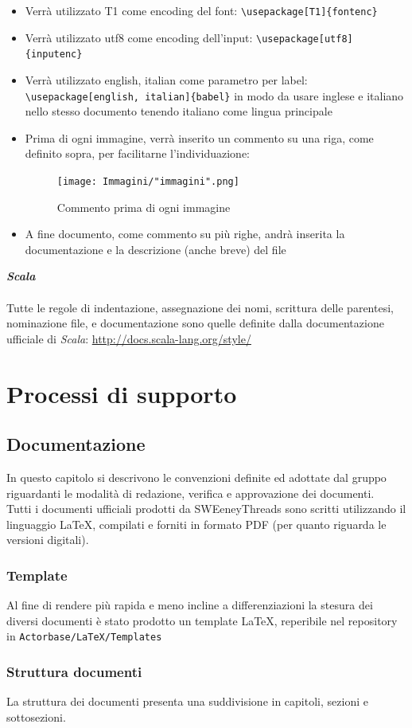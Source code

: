 \documentclass[a4paper]{report}
\newcommand{\mychapter}[2]{
	\setcounter{chapter}{#1}
	\setcounter{section}{0}
	\setcounter{subsection}{1}
	\chapter*{#2}
	\addcontentsline{toc}{chapter}{#2}
}
\begin{document}
\begin{itemize}
\begin{figure}[h!]
		\end{figure}
		\item Verrà utilizzato T1 come encoding del font: \verb|\usepackage[T1]{fontenc}|
		\item Verrà utilizzato utf8 come encoding dell'input: \verb|\usepackage[utf8]{inputenc}|
		\item Verrà utilizzato english, italian come parametro per label: \verb|\usepackage[english, italian]{babel}| in modo da 
		usare inglese e italiano nello stesso documento tenendo italiano come lingua principale
		\item Prima di ogni immagine, verrà inserito un commento su una riga, come definito sopra, per facilitarne l'individuazione:
		\begin{figure}[h!]
			\centering
			\texttt{[image: Immagini/"immagini".png]}
			\caption{Commento prima di ogni immagine}
		\end{figure}
		\item A fine documento, come commento su più righe, andrà inserita la documentazione e la descrizione (anche breve) del file
	\end{itemize}
	\textbf{\emph{Scala}} \\ \\ 
	Tutte le regole di indentazione, assegnazione dei nomi, scrittura delle parentesi, nominazione file, e documentazione sono quelle
	definite dalla documentazione ufficiale di \emph{Scala}: \url{http://docs.scala-lang.org/style/}
	\mychapter{3}{Processi di supporto}
	\section{Documentazione} %
	In questo capitolo si descrivono le convenzioni definite ed adottate dal gruppo riguardanti le 
	modalità di redazione, verifica e approvazione dei documenti. \\
	Tutti i documenti ufficiali prodotti da SWEeneyThreads sono scritti utilizzando il linguaggio \LaTeX{}, compilati e
	forniti in formato PDF (per quanto riguarda le versioni digitali).
	\subsection{Template}
	Al fine di rendere più rapida e meno incline a differenziazioni la stesura dei diversi documenti è stato prodotto un
	template \LaTeX, reperibile nel repository in \verb|Actorbase/LaTeX/Templates| %
	\subsection{Struttura documenti}
	La struttura dei documenti presenta una suddivisione in capitoli, sezioni e sottosezioni. 
	
\end{document}
